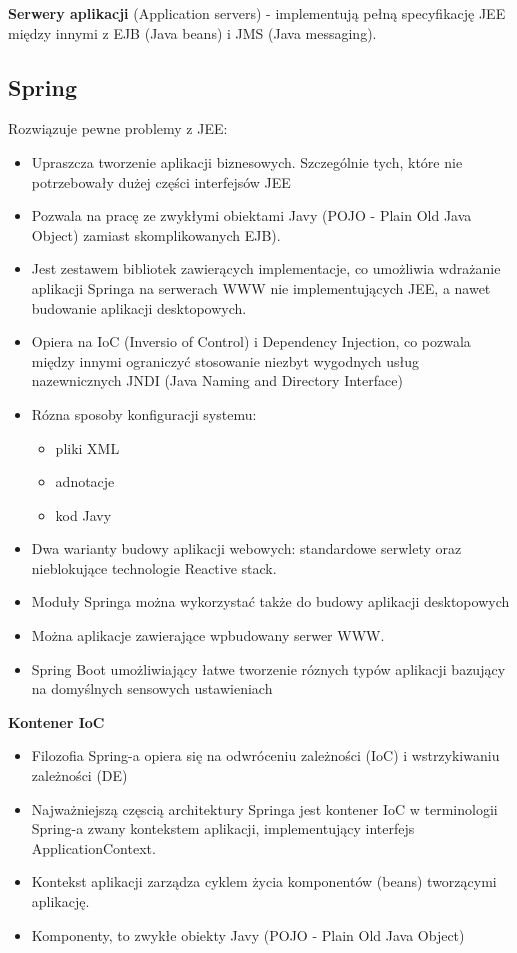 \documentclass[../main.tex]{subfiles}
\begin{document}
    \textbf{Serwery aplikacji} (Application servers) - implementują pełną specyfikację JEE między innymi z EJB (Java beans) i
    JMS (Java messaging).

    \subsection{Spring}
    Rozwiązuje pewne problemy z JEE:
    \begin{itemize}
        \item Upraszcza tworzenie aplikacji biznesowych. Szczególnie tych, które nie
        potrzebowały dużej części interfejsów JEE
        \item Pozwala na pracę ze zwykłymi obiektami Javy (POJO - Plain Old Java
        Object) zamiast skomplikowanych EJB).
        \item Jest zestawem bibliotek zawierących implementacje, co umożliwia
        wdrażanie aplikacji Springa na serwerach WWW nie implementujących
        JEE, a nawet budowanie aplikacji desktopowych.
        \item Opiera na IoC (Inversio of Control) i Dependency Injection, co
        pozwala między innymi ograniczyć stosowanie niezbyt wygodnych usług
        nazewnicznych JNDI (Java Naming and Directory Interface)
    \end{itemize}

    \begin{itemize}
        \item Rózna sposoby konfiguracji systemu:
        \begin{itemize}
            \item pliki XML
            \item adnotacje
            \item kod Javy
        \end{itemize}
        \item Dwa warianty budowy aplikacji webowych: standardowe serwlety oraz nieblokujące technologie Reactive stack.
        \item Moduły Springa można wykorzystać także do budowy aplikacji desktopowych
        \item Można aplikacje zawierające wpbudowany serwer WWW.
        \item Spring Boot umożliwiający łatwe tworzenie róznych typów aplikacji bazujący
        na domyślnych sensowych ustawieniach
    \end{itemize}

    \textbf{Kontener IoC}
    \begin{itemize}
        \item Filozofia Spring-a opiera się na odwróceniu zależności (IoC) i wstrzykiwaniu
        zależności (DE)
        \item Najważniejszą częscią architektury Springa jest kontener IoC w
        terminologii Spring-a zwany kontekstem aplikacji, implementujący interfejs
        ApplicationContext.
        \item Kontekst aplikacji zarządza cyklem życia komponentów (beans) tworzącymi
        aplikację.
        \item Komponenty, to zwykłe obiekty Javy (POJO - Plain Old Java Object)
    \end{itemize}
\end{document}
